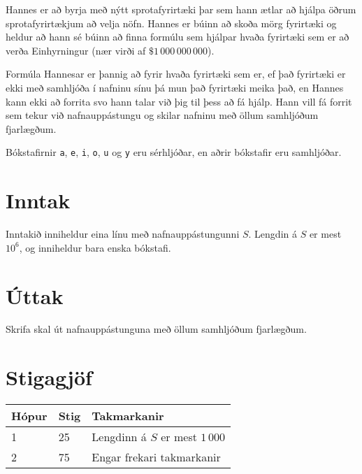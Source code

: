 %
Hannes er að byrja með nýtt sprotafyrirtæki þar sem hann ætlar að hjálpa öðrum sprotafyrirtækjum að velja nöfn.
Hannes er búinn að skoða mörg fyrirtæki og heldur að hann sé búinn að finna formúlu sem hjálpar hvaða
fyrirtæki sem er að verða Einhyrningur (nær virði af $\$1\,000\,000\,000$).

Formúla Hannesar er þannig að fyrir hvaða fyrirtæki sem er, ef það fyrirtæki er ekki með samhljóða í nafninu sínu þá mun það fyrirtæki meika það, en
Hannes kann ekki að forrita svo hann talar við þig til þess að fá hjálp. Hann vill fá forrit sem tekur við nafnauppástungu
og skilar nafninu með öllum samhljóðum fjarlægðum.

Bókstafirnir \texttt{a}, \texttt{e}, \texttt{i}, \texttt{o}, \texttt{u} og
\texttt{y} eru sérhljóðar, en aðrir bókstafir eru samhljóðar.

\section*{Inntak}
Inntakið inniheldur eina línu með nafnauppástungunni $S$. Lengdin á $S$ er mest $10^6$, og inniheldur bara enska bókstafi.

\section*{Úttak}
Skrifa skal út nafnauppástunguna með öllum samhljóðum fjarlægðum.

\section*{Stigagjöf}
\begin{tabular}{|l|l|l|}
\hline
Hópur & Stig & Takmarkanir \\ \hline
1     & 25   & Lengdinn á $S$ er mest $1\,000$ \\ \hline
2     & 75   & Engar frekari takmarkanir \\ \hline
\end{tabular}


